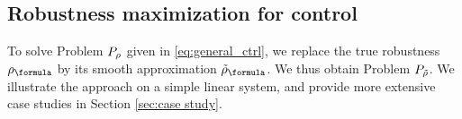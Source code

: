 \subsection{Robustness maximization for control}
\label{sec:toy example}
To solve Problem $P_\rho$ given in \eqref{eq:general_ctrl}, we replace the true robustness $\robf$ by its smooth approximation $\srobf$.
We thus obtain Problem $P_{\tilde{\rho}}$.
We illustrate the approach on a simple linear system,
and provide more extensive case studies in Section \ref{sec:case study}.




%